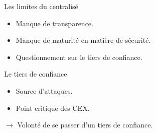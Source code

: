 \begin{frame}{Les limites du centralisé}
    \begin{itemize}
        \item Manque de transparence.
        \item Manque de maturité en matière de sécurité.
        \item Questionnement sur le tiers de confiance.
    \end{itemize}
    \begin{block}{Le tiers de confiance}
        \begin{itemize}
            \item Source d'attaques.
            \item Point critique des CEX.
        \end{itemize}
        $\rightarrow$ Volonté de se passer d'un tiers de confiance.
    \end{block}
\end{frame}